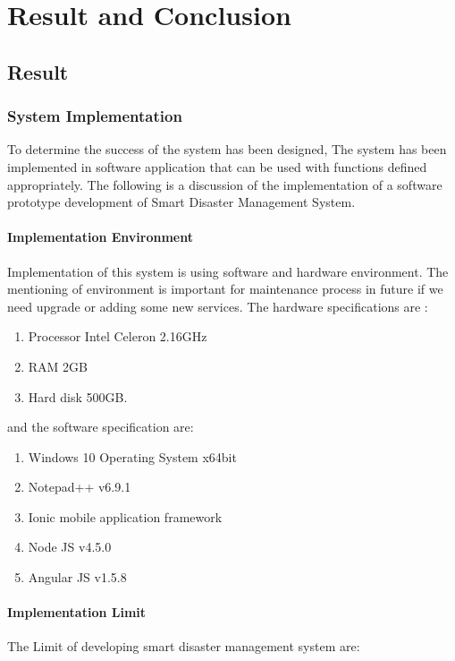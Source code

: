 \chapter{Result and Conclusion}
\section{Result}
\vspace{-0.5cm}
\subsection{System Implementation}
To determine the success of the system has been designed, The system has been implemented in software application that can be used with functions defined appropriately. The following is a discussion of the implementation of a software prototype development of Smart Disaster Management System.
\subsubsection{Implementation Environment}
Implementation of this system is using software and hardware environment. The mentioning of environment is important for maintenance process in future if we need upgrade or adding some new services. The hardware specifications are :
\begin{enumerate}
\setlength{\itemsep}{1.5pt}
\setlength{\parskip}{1.5pt}
\item Processor Intel Celeron 2.16GHz
\item RAM 2GB
\item Hard disk 500GB.
\end{enumerate}\par 

and the software specification are:
\begin{enumerate}
\setlength{\itemsep}{1.5pt}
\setlength{\parskip}{1.5pt}
\item Windows 10 Operating System x64bit
\item Notepad++ v6.9.1
\item Ionic mobile application framework
\item Node JS v4.5.0
\item Angular JS v1.5.8
\end{enumerate}

\subsubsection{Implementation Limit}
The Limit of developing smart disaster management system are:


